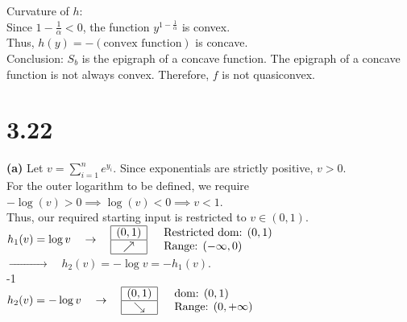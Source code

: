 \documentclass{article}
\begin{document}
\noindent Curvature of  $h$: \\
\indent Since $1 - \frac{1}{\alpha} < 0$, the function $y^{1 - \frac{1}{\alpha}}$ is convex. \\
\indent Thus, $h(y) = -(\text{convex function})$ is concave. \\[1.5em]

\noindent Conclusion: $S_b$ is the epigraph of a concave function. The epigraph of a concave function is not always convex. Therefore, $f$ is not quasiconvex.

\newpage

\section*{3.22}


\textbf{(a)} \noindent Let $v = \sum_{i=1}^{n} e^{y_i}$. Since exponentials are strictly positive, $v > 0$. \\
\noindent For the outer logarithm to be defined, we require $-\log(v) > 0 \implies \log(v) < 0 \implies v < 1$. \\
\noindent Thus, our required starting input is restricted to $v \in (0, 1)$. \\[1.5em]

\noindent  $h_1(v) = \log v \quad \rightarrow \quad 
\begin{array}{|c|} 
\hline (0, 1) \\ \hline \nearrow \\ \hline 
\end{array} \quad 
\begin{array}{l} 
\text{Restricted dom: } (0, 1) \\ 
\text{Range: } (-\infty, 0) 
\end{array}$ \\[1.5em]

\noindent $\xrightarrow{\hspace{2cm}} \quad h_2(v) = -\log v = -h_1(v)$. \\
\indent {} -1  \\[1em]

\noindent $h_2(v) = -\log v \quad \rightarrow \quad 
\begin{array}{|c|} 
\hline (0, 1) \\ \hline \searrow \\ \hline 
\end{array} \quad 
\begin{array}{l} 
\text{dom: } (0, 1) \\ 
\text{Range: } (0, +\infty) 
\end{array}$ \\[2em]
\end{document}
